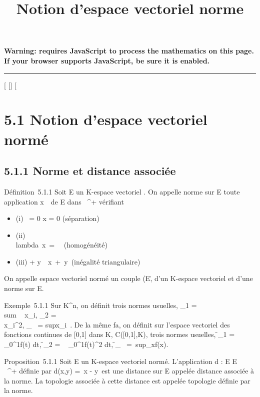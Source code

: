 \documentclass[]{article}
\title{Notion d'espace vectoriel norme}
\author{}
\date{}
\begin{document}
\maketitle

\textbf{Warning: 
requires JavaScript to process the mathematics on this page.\\ If your
browser supports JavaScript, be sure it is enabled.}

\begin{center}\rule{3in}{0.4pt}\end{center}

[
[]
[

\section{5.1 Notion d'espace vectoriel normé}

\subsection{5.1.1 Norme et distance associée}

Définition~5.1.1 Soit E un K-espace vectoriel . On appelle norme sur E
toute application
x\mapsto~\x\
de E dans ~^+ vérifiant

\begin{itemize}
\itemsep1pt\parskip0pt
\item
  (i) \x\ = 0
  \Leftrightarrow x = 0 (séparation)
\item
  (ii) \\lambda~x\ =
  \lambda~\x\
  (homogénéité)
\item
  (iii) \x + y\
  \leq\ x\
  +\ y\ (inégalité
  triangulaire)
\end{itemize}

On appelle espace vectoriel normé un couple
(E,\.\) d'un K-espace
vectoriel et d'une norme sur E.

Exemple~5.1.1 Sur K^n, on définit trois normes usuelles,
\x_1
= \\sum ~
x_i,
\x_2 =
\sqrt\\\sum
 x_i^2,
\x_\infty~
= supx_i~. De la
même fa\ccon, on définit sur l'espace vectoriel des
fonctions continues de [0,1] dans K, C([0,1],K), trois normes
usuelles,
\f_1
=\int ~
_0^1f(t) dt,
\f_2 =
\sqrt\int ~
_0^1f(t)^2 dt,
\f_\infty~
=\
sup_x\in[0,1]f(x).

Proposition~5.1.1 Soit E un K-espace vectoriel normé. L'application d :
E \times E \rightarrow~ ~^+ définie par d(x,y) =\ x
- y\ est une distance sur E appelée distance
associée à la norme. La topologie associée à cette distance est appelée
topologie définie par la norme.
\end{document}
